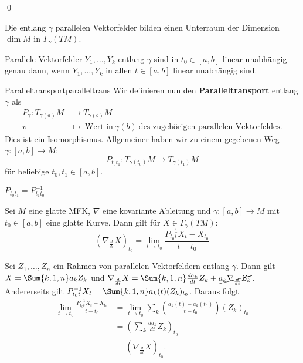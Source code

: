 \qed
\begin{korollar}{}{}
Die entlang $\gamma$ parallelen Vektorfelder bilden einen Unterraum der Dimension $\dim M$ in $\Gamma_\gamma (TM)$.
\end{korollar}
\begin{korollar}{}{}
Parallele Vektorfelder $Y_1, \dots, Y_k$ entlang $\gamma$ sind in $t_0 \in [a,b]$ linear unabhängig genau dann, wenn $Y_1, \dots, Y_k$ in allen $t \in [a,b]$ linear unabhängig sind.
\end{korollar}
\begin{definition}{Paralleltransport}{paralleltrans}
Wir definieren nun den \textbf{Paralleltransport} entlang $\gamma$ als
\begin{align}
P_\gamma: T_{\gamma(a)} M &\to T_{\gamma(b)} M \\
v &\mapsto \ \text{Wert in} \ \gamma(b) \ \text{des zugehörigen parallelen Vektorfeldes}.
\end{align}
Dies ist ein Isomorphismus.
Allgemeiner haben wir zu einem gegebenen Weg $\gamma: [a,b] \to M$:
\begin{equation}
P_{t_0t_1}: T_{\gamma(t_0)} M \to T_{\gamma(t_1)}M
\end{equation}
für beliebige $t_0, t_1 \in [a,b]$.
\end{definition}
\begin{bemerkung}
$P_{t_0t_1} = P_{t_1t_0}^{-1}$
\end{bemerkung}
\begin{satz}{}{}
Sei $M$ eine glatte MFK, $\nabla$ eine kovariante Ableitung und $\gamma: [a,b] \to M$ mit $t_0 \in [a,b]$ eine glatte Kurve. Dann gilt für $X \in \Gamma_\gamma (TM)$:
\begin{equation}
(\nabla_\frac{d}{dt}X)_{t_0} = \lim_{t \to t_0} \frac{P_{t_0t}^{-1} X_t - X_{t_0}}{t-t_0}
\end{equation}
\end{satz}
\begin{beweis}
Sei $Z_1, \dots, Z_n$ ein Rahmen von parallelen Vektorfeldern entlang $\gamma$. Dann gilt $X = \Sum{k,1,n} a_k Z_k$ und $\nabla_\frac{d}{dt} X = \Sum{k,1,n} \frac{d a_k}{dt} Z_k + \cancel{a_k \nabla_\frac{d}{dt} Z_k}$. Andererseits gilt $P_{t_0t}^{-1} X_t = \Sum{k,1,n} a_k(t) (Z_k)_{t_0}$. Daraus folgt
\begin{align}
\lim_{t \to t_0} \frac{P_{t_0t}^{-1} X_t - X_{t_0}}{t-t_0} &= \lim_{t \to t_0} \sum_k \left( \frac{a_k(t) - a_k(t_0)}{t-t_0} \right) (Z_k)_{t_0} \\
&= \left( \sum_k \frac{d a_k}{dt} Z_k\right)_{t_0} \\
&= \left( \nabla_\frac{d}{dt} X\right)_{t_0}.
\end{align}
\end{beweis}
